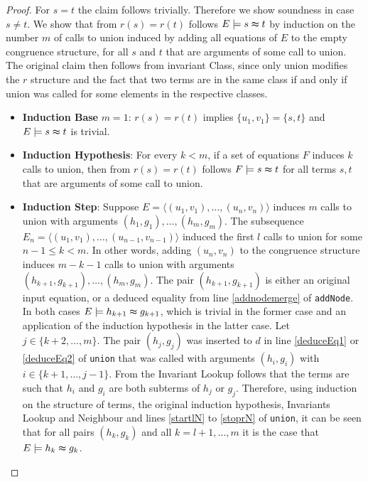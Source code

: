 \begin{proof}
\noindent For $s = t$ the claim follows trivially.
Therefore we show soundness in case $s \neq t$.
We show that from $r(s) = r(t)$ follows $E \models s \thickapprox t$ by induction on the number $m$ of calls to union induced by adding all equations of $E$ to the empty congruence structure, for all $s$ and $t$ that are arguments of some call to union.
The original claim then follows from invariant Class, since only union modifies the $r$ structure and the fact that two terms are in the same class if and only if union was called for some elements in the respective classes.
\begin{itemize}
\item \textbf{Induction Base} $m = 1$: $r(s) = r(t)$ implies $\{u_1,v_1\} = \{s,t\}$ and $E \models s \thickapprox t$ is trivial.


\item \textbf{Induction Hypothesis}: For every $k < m$, if a set of equations $F$ induces $k$ calls to union, then from $r(s) = r(t)$ follows $F \models s \thickapprox t$ for all terms $s,t$ that are arguments of some call to union.

\item \textbf{Induction Step}: Suppose $E = \langle (u_1,v_1), \ldots, (u_n,v_n) \rangle$ induces $m$ calls to union with arguments $(h_1,g_1),\ldots,(h_m,g_m)$.
The subsequence $E_n = \langle (u_1,v_1), \ldots, (u_{n-1},v_{n-1}) \rangle$ induced the first $l$ calls to union for some $n-1 \leq k < m$.
In other words, adding $(u_n,v_n)$ to the congruence structure induces $m-k-1$ calls to union with arguments $(h_{k+1},g_{k+1}),\ldots,(h_m,g_m)$.
The pair $(h_{k+1},g_{k+1})$ is either an original input equation, or a deduced equality from line \ref{addnodemerge} of \texttt{addNode}.
In both cases $E \models h_{k+1} \thickapprox g_{k+1}$, which is trivial in the former case and an application of the induction hypothesis in the latter case.
Let $j \in \{k+2,\ldots,m\}$.
The pair $(h_j,g_j)$ was inserted to $d$ in line \ref{deduceEq1} or \ref{deduceEq2} of \texttt{union} that was called with arguments $(h_i,g_i)$ with $i \in \{k+1,\ldots,j-1\}$.
From the Invariant Lookup follows that the terms are such that $h_i$ and $g_i$ are both subterms of $h_j$ or $g_j$.
Therefore, using induction on the structure of terms, the original induction hypothesis, Invariants Lookup and Neighbour and lines \ref{startlN} to \ref{stoprN} of \texttt{union}, it can be seen that for all pairs $(h_k,g_k)$ and all $k = l+1,\ldots,m$ it is the case that $E \models h_k \thickapprox g_k$.


\end{itemize}
\end{proof}
